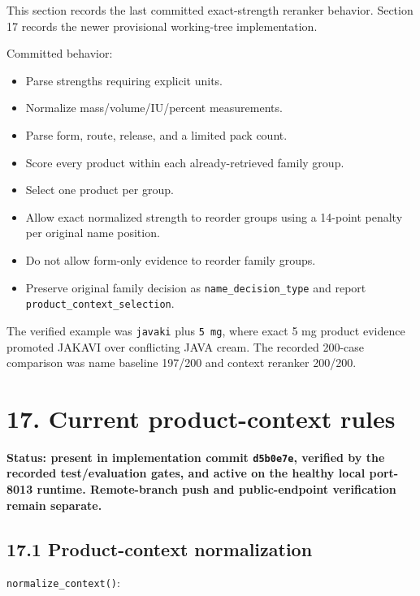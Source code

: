 This section records the last committed exact-strength reranker behavior. Section 17 records the newer provisional working-tree implementation.

Committed behavior:

\begin{itemize}
\tightlist
\item
  Parse strengths requiring explicit units.
\item
  Normalize mass/volume/IU/percent measurements.
\item
  Parse form, route, release, and a limited pack count.
\item
  Score every product within each already-retrieved family group.
\item
  Select one product per group.
\item
  Allow exact normalized strength to reorder groups using a 14-point penalty per original name position.
\item
  Do not allow form-only evidence to reorder family groups.
\item
  Preserve original family decision as \texttt{name\_\allowbreak{}decision\_\allowbreak{}type} and report \texttt{product\_\allowbreak{}context\_\allowbreak{}selection}.
\end{itemize}

The verified example was \texttt{javaki} plus \texttt{5\ mg}, where exact 5 mg product evidence promoted JAKAVI over conflicting JAVA cream. The recorded 200-case comparison was name baseline 197/200 and context reranker 200/200.

\section{17. Current product-context rules}\label{17-current-product-context-rules}

\textbf{Status: present in implementation commit \texttt{d5b0e7e}, verified by the recorded test/evaluation gates, and active on the healthy local port-8013 runtime. Remote-branch push and public-endpoint verification remain separate.}

\subsection{17.1 Product-context normalization}\label{171-product-context-normalization}

\texttt{normalize\_\allowbreak{}context()}:


